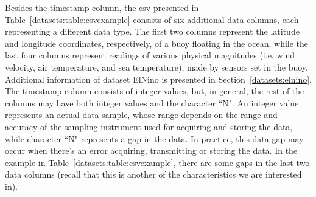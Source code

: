 Besides the timestamp column, the csv presented in Table~\ref{datasets:table:csvexample} consists of six additional data columns, each representing a different data type. The first two columns represent the latitude and longitude coordinates, respectively, of a buoy floating in the ocean, while the last four columns represent readings of various physical magnitudes (i.e. wind velocity, air temperature, and sea temperature), made by sensors set in the buoy. Additional information of dataset ElNino is presented in Section~\ref{datasets:elnino}. The timestamp column consists of integer values, but, in general, the rest of the columns may have both integer values and the character ``N". An integer value represents an actual data sample, whose range depends on the range and accuracy of the sampling instrument used for acquiring and storing the data, while character ``N" represents a gap in the data. In practice, this data gap may occur when there's an error acquiring, transmitting or storing the data. In the example in Table~\ref{datasets:table:csvexample}, there are some gaps in the last two data columns (recall that this is another of the characteristics we are interested in).

